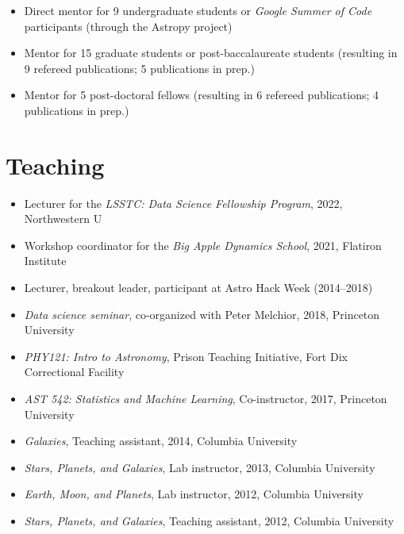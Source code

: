 \documentclass[12pt, letterpaper]{apw-cv}
\begin{document}



\begin{itemize}
    \item Direct mentor for 9 undergraduate students or \textit{Google Summer of Code} participants (through the Astropy project)
    \item Mentor for 15 graduate students or post-baccalaureate students (resulting in 9 refereed publications; 5 publications in prep.)
    \item Mentor for 5 post-doctoral fellows (resulting in 6 refereed publications; 4 publications in prep.)
\end{itemize}

\section*{Teaching}

\begin{itemize}
    \item Lecturer for the \textit{LSSTC: Data Science Fellowship Program}, 2022, Northwestern U
    \item Workshop coordinator for the \textit{Big Apple Dynamics School}, 2021, Flatiron Institute
    \item Lecturer, breakout leader, participant at Astro Hack Week (2014--2018)
    \item \emph{Data science seminar}, co-organized with Peter Melchior, 2018, Princeton University
    \item \emph{PHY121: Intro to Astronomy}, Prison Teaching Initiative, Fort Dix Correctional Facility
	\item \emph{AST 542: Statistics and Machine Learning}, Co-instructor, 2017, Princeton University
    \item \emph{Galaxies}, Teaching assistant, 2014, Columbia University
	\item \emph{Stars, Planets, and Galaxies}, Lab instructor, 2013, Columbia University
	\item \emph{Earth, Moon, and Planets}, Lab instructor, 2012, Columbia University
	\item \emph{Stars, Planets, and Galaxies}, Teaching assistant, 2012, Columbia University
\end{itemize}
\end{document}
